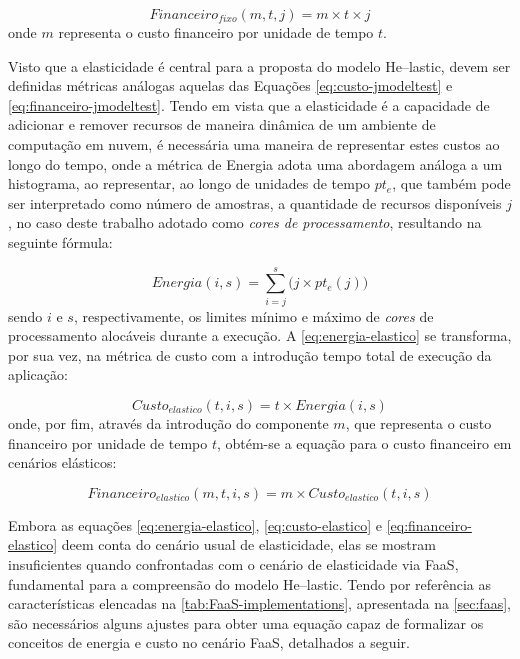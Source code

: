 \documentclass[english,brazilian]{UNISINOSmonografia} %
\begin{document}
\begin{equation}
\label{eq:financeiro-jmodeltest}
Financeiro_{fixo}(m,t,j) = m \times t \times j
\end{equation}
onde $ m $ representa o custo financeiro por unidade de tempo $ t $.



Visto que a elasticidade é central para a proposta do modelo \textsf{He}--lastic, devem ser definidas métricas análogas aquelas das Equações \ref{eq:custo-jmodeltest} e \ref{eq:financeiro-jmodeltest}.
Tendo em vista que a elasticidade é a capacidade de adicionar e remover recursos de maneira dinâmica de um ambiente de computação em nuvem, é necessária uma maneira de representar estes custos ao longo do tempo, onde a métrica de Energia adota uma abordagem análoga a um histograma, ao representar, ao longo de unidades de tempo $ pt_e $, que também pode ser interpretado como número de amostras, a quantidade de recursos disponíveis $ j $, no caso deste trabalho adotado como \textit{cores de processamento}, resultando na seguinte fórmula:

\begin{equation}
\label{eq:energia-elastico}
Energia(i,s) = \sum_{i=j}^{s} \big( j \times pt_e(j) \big) 
\end{equation}
sendo $ i $ e $ s $, respectivamente, os limites mínimo e máximo de \textit{cores} de processamento alocáveis durante a execução.
A \autoref{eq:energia-elastico} se transforma, por sua vez, na métrica de custo com a introdução tempo total de execução da aplicação:

\begin{equation}
\label{eq:custo-elastico}
Custo_{elastico}(t,i,s) = t \times Energia(i,s)
\end{equation}
onde, por fim, através da introdução do componente $ m $, que representa o custo financeiro por unidade de tempo $ t $, obtém-se a equação para o custo financeiro em cenários elásticos:

\begin{equation}
\label{eq:financeiro-elastico}
Financeiro_{elastico}(m,t,i,s) = m \times Custo_{elastico}(t,i,s)
\end{equation}



Embora as equações \ref{eq:energia-elastico}, \ref{eq:custo-elastico} e \ref{eq:financeiro-elastico} deem conta do cenário usual de elasticidade, elas se mostram insuficientes quando confrontadas com o cenário de elasticidade via FaaS, fundamental para a compreensão do modelo \textsf{He}--lastic.
Tendo por referência as características elencadas na \autoref{tab:FaaS-implementations}, apresentada na \autoref{sec:faas}, são necessários alguns ajustes para obter uma equação capaz de formalizar os conceitos de energia e custo no cenário FaaS, detalhados a seguir.
\end{document}
